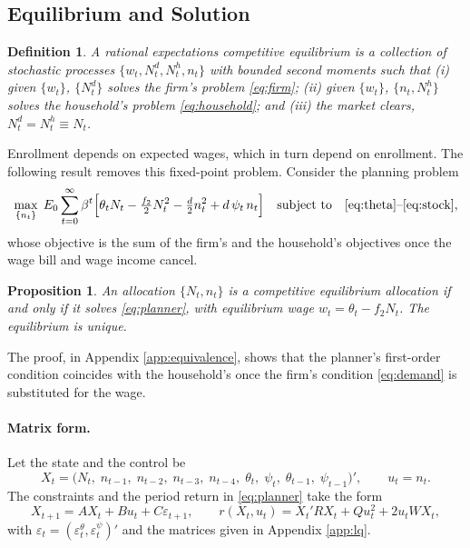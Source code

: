\documentclass[12pt]{article}
\newtheorem{definition}{Definition}
\newtheorem{proposition}{Proposition}
\begin{document}
\subsection{Equilibrium and Solution}\label{sec:planner}

\begin{definition}
A rational expectations competitive equilibrium is a collection of stochastic processes $\{w_t, N^{d}_t, N^{h}_t, n_t\}$ with bounded second moments such that (i) given $\{w_t\}$, $\{N^{d}_t\}$ solves the firm's problem \eqref{eq:firm}; (ii) given $\{w_t\}$, $\{n_t, N^{h}_t\}$ solves the household's problem \eqref{eq:household}; and (iii) the market clears, $N^{d}_t = N^{h}_t \equiv N_t$.
\end{definition}

\noindent Enrollment depends on expected wages, which in turn depend on enrollment. The following result removes this fixed-point problem. Consider the planning problem
\begin{equation}\label{eq:planner}
  \max_{\{n_t\}} \; E_0 \sum_{t=0}^{\infty} \beta^{t}
  \Big[ \theta_t N_t - \tfrac{f_2}{2} N_t^{2} - \tfrac{d}{2} n_t^{2} + d\,\psi_t\, n_t \Big]
  \quad \text{subject to}\quad \eqref{eq:theta}\text{--}\eqref{eq:stock} ,
\end{equation}
whose objective is the sum of the firm's and the household's objectives once the wage bill and wage income cancel.

\begin{proposition}\label{prop:equivalence}
An allocation $\{N_t, n_t\}$ is a competitive equilibrium allocation if and only if it solves \eqref{eq:planner}, with equilibrium wage $w_t = \theta_t - f_2 N_t$. The equilibrium is unique.
\end{proposition}

\noindent The proof, in Appendix \ref{app:equivalence}, shows that the planner's first-order condition coincides with the household's once the firm's condition \eqref{eq:demand} is substituted for the wage.

\paragraph{Matrix form.} Let the state and the control be
\[
  X_t = \big(N_t,\; n_{t-1},\; n_{t-2},\; n_{t-3},\; n_{t-4},\; \theta_t,\; \psi_t,\; \theta_{t-1},\; \psi_{t-1}\big)', \qquad u_t = n_t .
\]
The constraints and the period return in \eqref{eq:planner} take the form
\begin{equation}\label{eq:transition}
  X_{t+1} = A X_t + B u_t + C \varepsilon_{t+1}, \qquad
  r(X_t, u_t) = X_t' R X_t + Q u_t^{2} + 2 u_t W X_t ,
\end{equation}
with $\varepsilon_t = (\varepsilon^{\theta}_t, \varepsilon^{\psi}_t)'$ and the matrices given in Appendix \ref{app:lq}.
\end{document}

